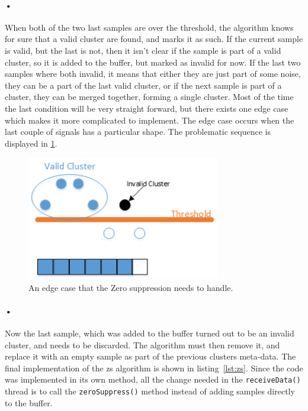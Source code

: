 \documentclass[a4paper, 12pt]{report}\dfrac{\right }{•}
\newcommand{\codeword}[1]{\texttt{#1}}
\begin{document}
\paragraph{•}
When both of the two last samples are over the threshold, the algorithm knows for sure that a valid cluster are found, and marks it as such.
If the current sample is valid, but the last is not, then it isn't clear if the sample is part of a valid cluster, so it is added to the buffer, but marked as invalid for now.
If the last two samples where both invalid, it means that either they are just part of some noise, they can be a part of the last valid cluster, or if the next sample is part of a cluster, they can be merged together, forming a single cluster.
Most of the time the last condition will be very straight forward, but there exists one edge case which makes it more complicated to implement.
The edge case occurs when the last couple of signals has a particular shape.
The problematic sequence is displayed in \ref{fig:zs-prob}.

\begin{figure}[h!]
	\centering
		\includegraphics[width=0.75\textwidth]{images/zs-prob.png}
		\caption{An edge case that the Zero suppression needs to handle.}
		\label{fig:zs-prob}
\end{figure}

\paragraph{•}
Now the last sample, which was added to the buffer turned out to be an invalid cluster, and needs to be discarded.
The algorithm must then remove it, and replace it with an empty sample as part of the previous clusters meta-data.
The final implementation of the \gls{zs} algorithm is shown in listing~\ref{lst:zs}.
Since the code was implemented in its own method, all the change needed in the \codeword{receiveData()} thread is to call the \codeword{zeroSuppress()} method instead of adding samples directly to the buffer.
\end{document}
